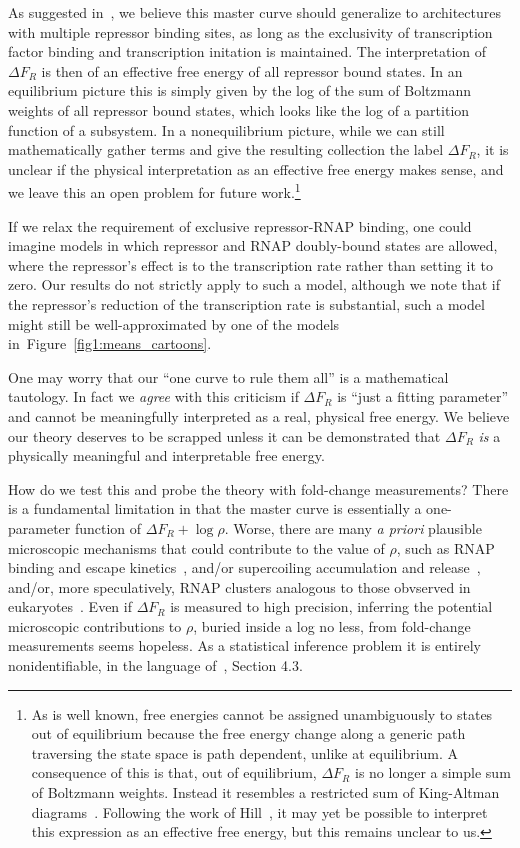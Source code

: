 \documentclass[12pt]{article}%
\newcommand{\fig}[1]{Figure~\ref{#1}}
\begin{document}
As suggested in~\cite{Chure2019}, we believe this master curve
should generalize to architectures with multiple repressor
binding sites, as long as the exclusivity of transcription factor
binding and transcription initation is maintained. The
interpretation of $\Delta F_R$ is then of an effective free
energy of all repressor bound states.
In an equilibrium picture this is simply given by the log of the
sum of Boltzmann weights of all repressor bound states, which
looks like the log of a partition function of a subsystem.
In a nonequilibrium picture, while we can still mathematically gather
terms and give the resulting collection the label $\Delta F_R$,
it is unclear if the physical interpretation as an effective free energy
makes sense, and we leave this an open problem for future work.\footnote{
As is well known, free energies cannot be assigned unambiguously
to states out of equilibrium because the free energy change along
a generic path traversing the state space is path dependent,
unlike at equilibrium.
A consequence of this is that, out of equilibrium, $\Delta F_R$
is no longer a simple sum of Boltzmann weights. Instead it
resembles a restricted sum of King-Altman
diagrams~\cite{King1956, Hill1966}. Following the work of
Hill~\cite{Hill1989}, it may yet be possible to interpret this expression
as an effective free energy, but this remains unclear to us.
}

If we relax the requirement of exclusive repressor-RNAP binding,
one could imagine models in which repressor and RNAP doubly-bound
states are allowed, where the repressor's effect is to
 the transcription rate rather than setting it to zero.
Our results do not strictly apply to such a model, although we
note that if the repressor's reduction of the transcription rate
is substantial, such a model might still be well-approximated by
one of the models in~\fig{fig1:means_cartoons}.

One may worry that our ``one curve to rule them all'' is a
mathematical tautology. In fact we \textit{agree} with this
criticism if $\Delta F_R$ is ``just a fitting parameter'' and cannot
be meaningfully interpreted as a real, physical free energy.
We believe our theory deserves to be scrapped unless it can be
demonstrated that $\Delta F_R$ \textit{is} a physically
meaningful and interpretable free energy.

How do we test this and probe the theory with fold-change
measurements? There is a fundamental limitation in that the
master curve is essentially a one-parameter function of $\Delta
F_R + \log\rho$. Worse, there are many \textit{a priori}
plausible microscopic mechanisms that could contribute to the
value of $\rho$, such as RNAP binding and escape
kinetics~\cite{DeHaseth1998, Mitarai2015}, and/or supercoiling
accumulation and release~\cite{Chong2014, Sevier2016}, and/or,
more speculatively, RNAP clusters analogous to those obvserved in
eukaryotes~\cite{Cisse2013}. Even if $\Delta F_R$ is measured to
high precision, inferring the potential microscopic contributions
to $\rho$, buried inside a log no less, from fold-change
measurements seems hopeless. As a statistical inference problem
it is entirely nonidentifiable, in the language
of~\cite{Gelman2013}, Section 4.3.
\end{document}
